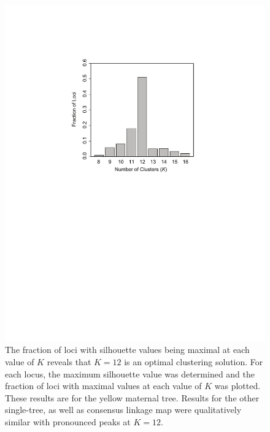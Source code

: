 \documentclass[smallextended]{svjour3}
\begin{document}
\begin{figure}[ht]
  \centering
  \includegraphics[width=\textwidth]{Fig_S1_TGG_foxtail_linkage}
  \caption{The fraction of loci with silhouette values being maximal at each
    value of $K$ reveals that $K = 12$ is an optimal clustering solution. For
    each locus, the maximum silhouette value was determined and the fraction of
    loci with maximal values at each value of $K$ was plotted. These results are
    for the yellow maternal tree. Results for the other single-tree, as well as
    consensus linkage map were qualitatively similar with pronounced peaks at $K
    = 12$.}
  \label{f:con}
\end{figure}
\end{document}
